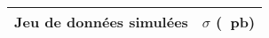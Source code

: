 \begin{tabular}{lc}
\toprule
Jeu de données simulées & $\sigma$ (\SI{}{\pico\barn})\\
\midrule
\bottomrule
\end{tabular}